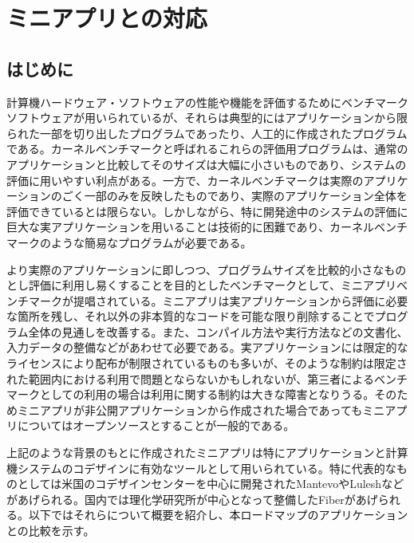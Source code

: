 \section{ミニアプリとの対応}
\label{sec:ミニアプリ}

\subsection{はじめに}

計算機ハードウェア・ソフトウェアの性能や機能を評価するためにベンチマークソフトウェアが用いられているが、それらは典型的にはアプリケーションから限られた一部を切り出したプログラムであったり、人工的に作成されたプログラムである。カーネルベンチマークと呼ばれるこれらの評価用プログラムは、通常のアプリケーションと比較してそのサイズは大幅に小さいものであり、システムの評価に用いやすい利点がある。一方で、カーネルベンチマークは実際のアプリケーションのごく一部のみを反映したものであり、実際のアプリケーション全体を評価できているとは限らない。しかしながら、特に開発途中のシステムの評価に巨大な実アプリケーションを用いることは技術的に困難であり、カーネルベンチマークのような簡易なプログラムが必要である。

より実際のアプリケーションに即しつつ、プログラムサイズを比較的小さなものとし評価に利用し易くすることを目的としたベンチマークとして、ミニアプリベンチマークが提唱されている。ミニアプリは実アプリケーションから評価に必要な箇所を残し、それ以外の非本質的なコードを可能な限り削除することでプログラム全体の見通しを改善する。また、コンパイル方法や実行方法などの文書化、入力データの整備などがあわせて必要である。実アプリケーションには限定的なライセンスにより配布が制限されているものも多いが、そのような制約は限定された範囲内における利用で問題とならないかもしれないが、第三者によるベンチマークとしての利用の場合は利用に関する制約は大きな障害となりうる。そのためミニアプリが非公開アプリケーションから作成された場合であってもミニアプリについてはオープンソースとすることが一般的である。

上記のような背景のもとに作成されたミニアプリは特にアプリケーションと計算機システムのコデザインに有効なツールとして用いられている。特に代表的なものとしては米国のコデザインセンターを中心に開発されたMantevoやLuleshなどがあげられる。国内では理化学研究所が中心となって整備したFiberがあげられる。以下ではそれらについて概要を紹介し、本ロードマップのアプリケーションとの比較を示す。

